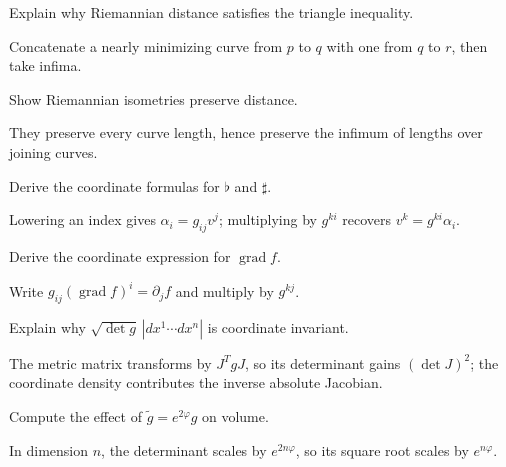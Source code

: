 \begin{problem}\label{prob:vii20-06}
Explain why Riemannian distance satisfies the triangle inequality.
\end{problem}
\begin{solution}
Concatenate a nearly minimizing curve from \(p\) to \(q\) with one from \(q\) to \(r\), then take infima.
\end{solution}

\begin{problem}\label{prob:vii20-07}
Show Riemannian isometries preserve distance.
\end{problem}
\begin{solution}
They preserve every curve length, hence preserve the infimum of lengths over joining curves.
\end{solution}

\begin{problem}\label{prob:vii20-08}
Derive the coordinate formulas for \(\flat\) and \(\sharp\).
\end{problem}
\begin{solution}
Lowering an index gives \(\alpha_i=g_{ij}v^j\); multiplying by \(g^{ki}\) recovers \(v^k=g^{ki}\alpha_i\).
\end{solution}

\begin{problem}\label{prob:vii20-09}
Derive the coordinate expression for \(\operatorname{grad}f\).
\end{problem}
\begin{solution}
Write \(g_{ij}(\operatorname{grad}f)^i=\partial_jf\) and multiply by \(g^{kj}\).
\end{solution}

\begin{problem}\label{prob:vii20-10}
Explain why \(\sqrt{\det g}\,|dx^1\cdots dx^n|\) is coordinate invariant.
\end{problem}
\begin{solution}
The metric matrix transforms by \(J^TgJ\), so its determinant gains \((\det J)^2\); the coordinate density contributes the inverse absolute Jacobian.
\end{solution}

\begin{problem}\label{prob:vii20-11}
Compute the effect of \(\widetilde g=e^{2\varphi}g\) on volume.
\end{problem}
\begin{solution}
In dimension \(n\), the determinant scales by \(e^{2n\varphi}\), so its square root scales by \(e^{n\varphi}\).
\end{solution}

